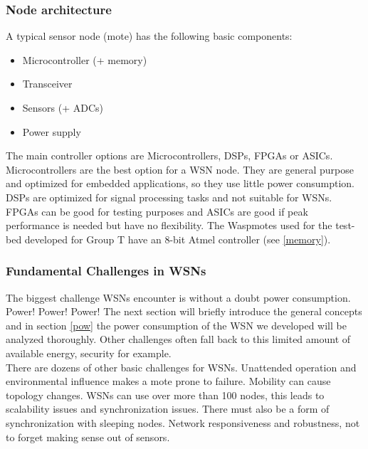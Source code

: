 \subsubsection{Node architecture}
A typical sensor node (mote) has the following basic components:
\begin{itemize}
\item Microcontroller (+ memory)
\item Transceiver
\item Sensors (+ ADCs)
\item Power supply
\end{itemize}
The main controller options are Microcontrollers, DSPs, FPGAs or ASICs. Microcontrollers are the best option for a WSN node. They are general purpose and optimized for embedded applications, so they use little power consumption. DSPs are optimized for signal processing tasks and not suitable for WSNs. FPGAs can be good for testing purposes and ASICs are good if peak performance is needed but have no flexibility. The Waspmotes used for the test-bed developed for Group T have an 8-bit Atmel controller (see \ref{memory}).
\subsubsection{Fundamental Challenges in WSNs}
The biggest challenge WSNs encounter is without a doubt power consumption. Power! Power! Power! The next section will briefly introduce the general concepts and in section \ref{pow} the power consumption of the WSN we developed will be analyzed thoroughly. Other challenges often fall back to this limited amount of available energy, security for example.\\
There are dozens of other basic challenges for WSNs. Unattended operation and environmental influence makes a mote prone to failure. Mobility can cause topology changes. WSNs can use over more than 100 nodes, this leads to scalability issues and synchronization issues. There must also be a form of synchronization with sleeping nodes. Network responsiveness and robustness, not to forget making sense out of sensors.
